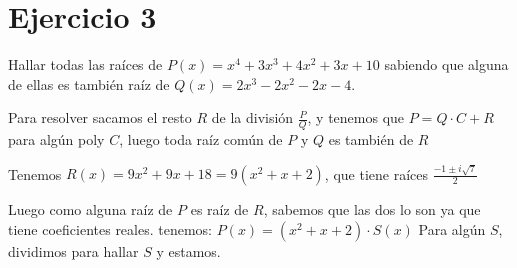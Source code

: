 \documentclass{article}
\begin{document}
\section{Ejercicio 3}
Hallar todas las raíces de $P(x) = x^4 + 3x^3 + 4x^2+3x+10$ sabiendo que
alguna de ellas es también raíz de $Q(x) = 2x^3-2x^2-2x-4$.

Para resolver sacamos el resto $R$ de la división $\frac{P}{Q}$, y tenemos
que $P = Q\cdot C + R$ para algún poly $C$, luego toda raíz común de $P$ y
$Q$ es también de $R$

Tenemos $R(x) = 9x^2 + 9x + 18 = 9(x^2+x+2)$, que tiene raíces $\frac{-1 \pm
i\sqrt{7}}{2}$

Luego como alguna raíz de $P$ es raíz de $R$, sabemos que las dos lo son ya
que tiene coeficientes reales. tenemos:
\(
	P(x) = (x^2 + x + 2) \cdot S(x)
\)
Para algún $S$, dividimos para hallar $S$ y estamos.
\end{document}
